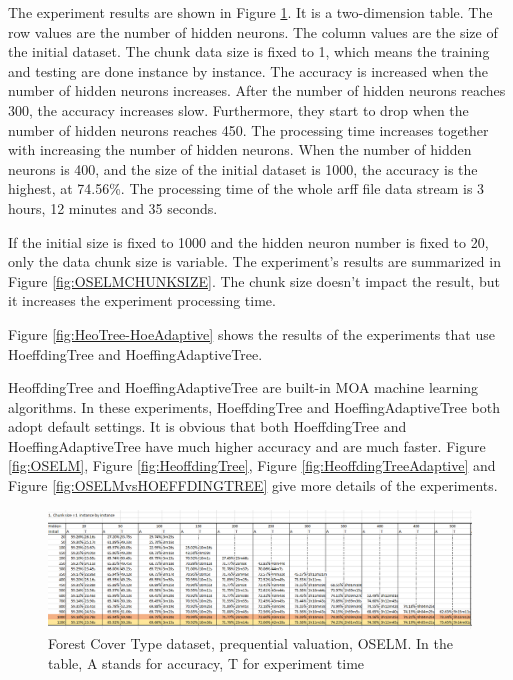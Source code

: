 \documentclass[a4paper, 14pt]{extarticle}
\begin{document}
\par The experiment results are shown in Figure \ref{fig:OSELMCOVTYPE}. It is a two-dimension table. The row values are the number of hidden neurons. The column values are the size of the initial dataset. The chunk data size is fixed to 1, which means the training and testing are done instance by instance. The accuracy is increased when the number of hidden neurons increases. After the number of hidden neurons reaches 300, the accuracy increases slow. Furthermore, they start to drop when the number of hidden neurons reaches 450. The processing time increases together with increasing the number of hidden neurons. When the number of hidden neurons is 400, and the size of the initial dataset is 1000, the accuracy is the highest, at 74.56\%. The processing time of the whole arff file data stream is 3 hours, 12 minutes and 35 seconds.
 \par If the initial size is fixed to 1000 and the hidden neuron number is fixed to 20, only the data chunk size is variable. The experiment's results are summarized in Figure \ref{fig:OSELMCHUNKSIZE}. The chunk size doesn't impact the result, but it increases the experiment processing time.
\par Figure \ref{fig:HeoTree-HoeAdaptive} shows the results of the experiments that use HoeffdingTree and HoeffingAdaptiveTree.
\par HeoffdingTree and HoeffingAdaptiveTree are built-in MOA machine learning algorithms. In these experiments, HoeffdingTree and HoeffingAdaptiveTree both adopt default settings. It is obvious that both HoeffdingTree and HoeffingAdaptiveTree have much higher accuracy and are much faster. Figure \ref{fig:OSELM}, Figure \ref{fig:HeoffdingTree}, Figure \ref{fig:HeoffdingTreeAdaptive} and Figure \ref{fig:OSELMvsHOEFFDINGTREE} give more details of the experiments. 
\begin{landscape}
\begin{figure}[H]
\centering
\includegraphics[width=1.4\textwidth]{7.png}
\caption{\label{fig:OSELMCOVTYPE}Forest Cover Type dataset, prequential valuation, OSELM. In the table, A stands for accuracy, T for experiment time}
\end{figure}
\end{landscape}
\end{document}
